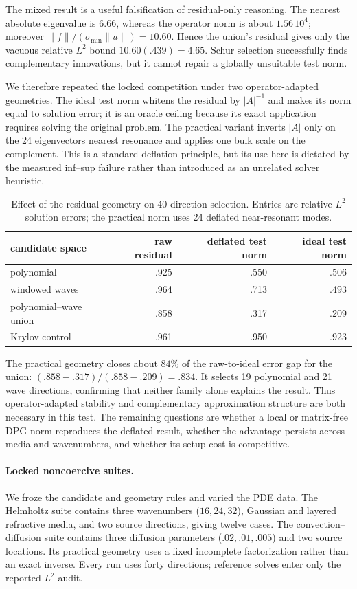 \documentclass[11pt]{article}
\numberwithin{algorithm}{section}
\theoremstyle{definition}\newtheorem{definition}[theorem]{Definition}
\theoremstyle{remark}\newtheorem{remark}[theorem]{Remark}
\begin{document}
The mixed result is a useful falsification of residual-only reasoning. The
nearest absolute eigenvalue is $6.66$, whereas the operator norm is about
$1.56\,10^4$; moreover
$\|f\|/(\sigma_{\min}\|u\|)=10.60$. Hence the union's residual gives only the
vacuous relative $L^2$ bound $10.60(.439)=4.65$. Schur selection successfully
finds complementary innovations, but it cannot repair a globally unsuitable
test norm.

We therefore repeated the locked competition under two operator-adapted
geometries. The ideal test norm whitens the residual by $|A|^{-1}$ and makes
its norm equal to solution error; it is an oracle ceiling because its exact
application requires solving the original problem. The practical variant
inverts $|A|$ only on the 24 eigenvectors nearest resonance and applies one
bulk scale on the complement. This is a standard deflation principle, but its
use here is dictated by the measured inf--sup failure rather than introduced
as an unrelated solver heuristic.

\begin{table}[t]
\centering
\caption{Effect of the residual geometry on 40-direction selection. Entries
are relative $L^2$ solution errors; the practical norm uses 24 deflated
near-resonant modes.}
\begin{tabular}{lrrr}
\toprule
candidate space & raw residual & deflated test norm & ideal test norm\\
\midrule
polynomial & .925 & .550 & .506\\
windowed waves & .964 & .713 & .493\\
polynomial--wave union & .858 & .317 & .209\\
Krylov control & .961 & .950 & .923\\
\bottomrule
\end{tabular}
\label{tab:heterogeneous-helmholtz-norms}
\end{table}

The practical geometry closes about $84\%$ of the raw-to-ideal error gap for
the union: $(.858-.317)/(.858-.209)=.834$. It selects 19 polynomial and 21
wave directions, confirming that neither family alone explains the result.
Thus operator-adapted stability and complementary approximation structure are
both necessary in this test. The remaining questions are whether a local or
matrix-free DPG norm reproduces the deflated result, whether the advantage
persists across media and wavenumbers, and whether its setup cost is competitive.

\paragraph{Locked noncoercive suites.}
We froze the candidate and geometry rules and varied the PDE data. The
Helmholtz suite contains three wavenumbers ($16,24,32$), Gaussian and layered
refractive media, and two source directions, giving twelve cases. The
convection--diffusion suite contains three diffusion parameters
($.02,.01,.005$) and two source locations. Its practical geometry uses a fixed
incomplete factorization rather than an exact inverse. Every run uses forty
directions; reference solves enter only the reported $L^2$ audit.
\end{document}
